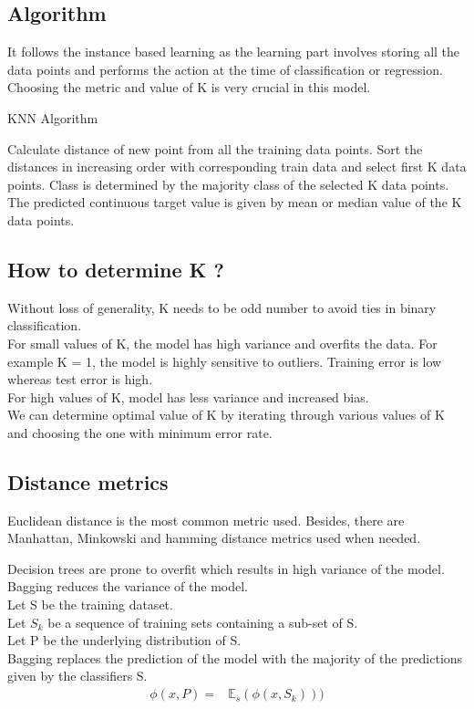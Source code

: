\documentclass[12pt,letterpaper, onecolumn]{exam}
\begin{document}
\subsection*{Algorithm}
It follows the instance based learning as the learning part involves storing all the data points and performs the action at the time of classification or regression. Choosing the metric and value of K is very crucial in this model.
\begin{algorithm}
\caption{KNN Algorithm}\label{cap}
\begin{algorithmic}

\State Calculate distance of new point from all the training data points.
\State Sort the distances in increasing order with corresponding train data and select first K data points.
\State Class is determined by the majority class of the selected K data points.
\EndIf
{}
\State The predicted continuous target value is given by mean or median value of the K data points.
\EndIf
\end{algorithmic}
\end{algorithm}




\subsection*{How to determine K ?}
Without loss of generality, K needs to be odd number to avoid ties in
binary classification.\\
For small values of K, the model has high variance and overfits the data. For example K = 1, the model is highly sensitive to outliers.
Training error is low whereas test error is high.\\
For high values of K, model has less variance and increased bias.\\
We can determine optimal value of K by iterating through various values of K and choosing the one with minimum error rate.

\subsection*{Distance metrics}
Euclidean distance is the most common metric used. Besides, there are Manhattan, Minkowski and hamming distance metrics used when needed.





Decision trees are prone to overfit which results in high variance of the model. Bagging reduces the variance of the model.\\
Let S be the training dataset. \\
Let ${S_k}$ be a sequence of training sets containing a sub-set of S.\\
 Let P be the underlying distribution of S.\\
Bagging replaces the prediction of the model with the majority of 
the predictions given by the classifiers S.
\begin{align}
\phi(x,P) = {}& \mathbb{E}_s(\phi(x,S_k)))
\end{align}
\end{document}
